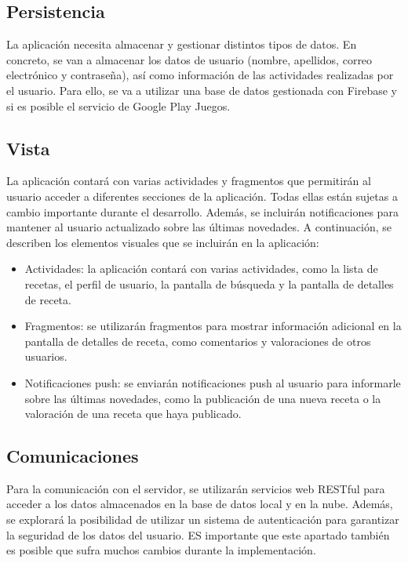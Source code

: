 \documentclass[a4paper, openright, 12pt]{article}
\begin{document}
\subsection{Persistencia}
La aplicación necesita almacenar y gestionar distintos tipos de datos. En concreto, se van a almacenar los datos de usuario (nombre, apellidos, correo electrónico y contraseña), así como información de las actividades realizadas por el usuario. Para ello, se va a utilizar una base de datos gestionada con Firebase y si es posible el servicio de Google Play Juegos.

\subsection{Vista}
La aplicación contará con varias actividades y fragmentos que permitirán al usuario acceder a diferentes secciones de la aplicación. Todas ellas están sujetas a cambio importante durante el desarrollo. Además, se incluirán notificaciones para mantener al usuario actualizado sobre las últimas novedades. A continuación, se describen los elementos visuales que se incluirán en la aplicación:
\begin{itemize}
    \item Actividades: la aplicación contará con varias actividades, como la lista de recetas, el perfil de usuario, la pantalla de búsqueda y la pantalla de detalles de receta.
    \item Fragmentos: se utilizarán fragmentos para mostrar información adicional en la pantalla de detalles de receta, como comentarios y valoraciones de otros usuarios.
    \item Notificaciones push: se enviarán notificaciones push al usuario para informarle sobre las últimas novedades, como la publicación de una nueva receta o la valoración de una receta que haya publicado.
\end{itemize}

\subsection{Comunicaciones}
Para la comunicación con el servidor, se utilizarán servicios web RESTful para acceder a los datos almacenados en la base de datos local y en la nube. Además, se explorará la posibilidad de utilizar un sistema de autenticación para garantizar la seguridad de los datos del usuario. ES importante que este apartado también es posible que sufra muchos cambios durante la implementación.
\end{document}
